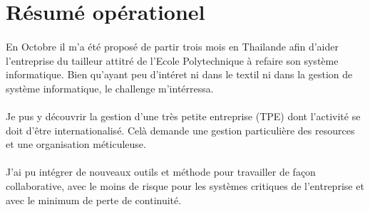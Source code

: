 \section*{Résumé opérationel}
\paragraph{}
En Octobre il m'a été proposé de partir trois mois en Thailande afin d'aider l'entreprise du tailleur attitré de l'Ecole Polytechnique à refaire son système informatique. Bien qu'ayant peu d'intéret ni dans le textil ni dans la gestion de système informatique, le challenge m'intérressa.
\paragraph{}
Je pus y découvrir la gestion d'une très petite entreprise (TPE) dont l'activité se doit d'être internationalisé. Celà demande une gestion particulière des resources et une organisation méticuleuse.
\paragraph{}
J'ai pu intégrer de nouveaux outils et méthode pour travailler de façon collaborative, avec le moins de risque pour les systèmes critiques de l'entreprise et avec le minimum de perte de continuité.
